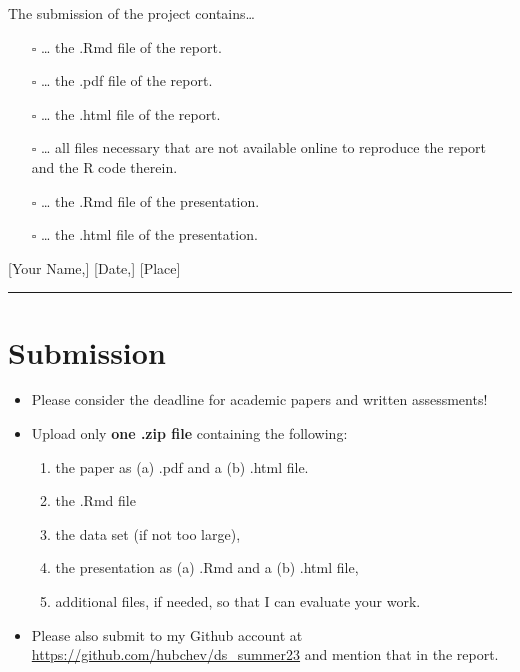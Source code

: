 \documentclass[
  12pt,
]{article}
\providecommand{\tightlist}{%
  \setlength{\itemsep}{0pt}\setlength{\parskip}{0pt}}
\begin{document}
The submission of the project contains\ldots{}

\begin{itemize}
\tightlist
\item[$\square$]
  \ldots{} the .Rmd file of the
  report.
\item[$\square$]
  \ldots{} the .pdf file of the report.
\item[$\square$]
  \ldots{} the .html file of the report.
\item[$\square$]
  \ldots{} all files necessary that are not available online to reproduce the report and the R code therein.
\item[$\square$]
  \ldots{} the .Rmd file of the presentation.
\item[$\square$]
  \ldots{} the .html file of the presentation.
\end{itemize}

{[}Your Name,{]} {[}Date,{]} {[}Place{]}

\begin{center}\rule{0.5\linewidth}{0.5pt}\end{center}

\hypertarget{submission}{%
\section{Submission}\label{submission}}

\begin{itemize}
\tightlist
\item
  Please consider the deadline for academic papers and written assessments!
\item
  Upload only \textbf{one .zip file} containing the following:

  \begin{enumerate}
  \def\labelenumi{\arabic{enumi}.}
  \tightlist
  \item
    the paper as (a) .pdf and a (b) .html file.
  \item
    the .Rmd file
  \item
    the data set (if not too large),
  \item
    the presentation as (a) .Rmd and a (b) .html file,
  \item
    additional files, if needed, so that I can evaluate your work.
  \end{enumerate}
\item
  Please also submit to my Github account at \url{https://github.com/hubchev/ds_summer23} and mention that in the report.
\end{itemize}
\end{document}
